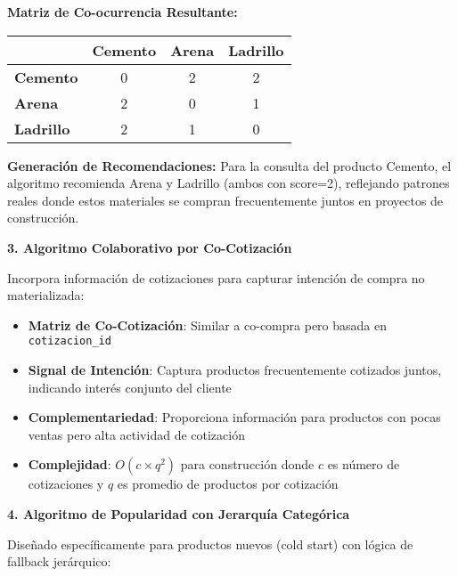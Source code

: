 \documentclass[twocolumn]{article}
\begin{document}
\textbf{Matriz de Co-ocurrencia Resultante:}

\begin{table}[H]
\centering
\begin{tabular}{|l|c|c|c|}
\hline
& \textbf{Cemento} & \textbf{Arena} & \textbf{Ladrillo} \\
\hline
\textbf{Cemento} & 0 & 2 & 2 \\
\hline
\textbf{Arena} & 2 & 0 & 1 \\
\hline
\textbf{Ladrillo} & 2 & 1 & 0 \\
\hline
\end{tabular}
\end{table}

\textbf{Generación de Recomendaciones:}
Para la consulta del producto Cemento, el algoritmo recomienda Arena y Ladrillo (ambos con score=2), reflejando patrones reales donde estos materiales se compran frecuentemente juntos en proyectos de construcción.

\vspace{0.3cm}

\textbf{3. Algoritmo Colaborativo por Co-Cotización}

Incorpora información de cotizaciones para capturar intención de compra no materializada:

\begin{itemize}
    \item \textbf{Matriz de Co-Cotización}: Similar a co-compra pero basada en \texttt{cotizacion\_id}
    \item \textbf{Signal de Intención}: Captura productos frecuentemente cotizados juntos, indicando interés conjunto del cliente
    \item \textbf{Complementariedad}: Proporciona información para productos con pocas ventas pero alta actividad de cotización
    \item \textbf{Complejidad}: \(O(c \times q^2)\) para construcción donde \(c\) es número de cotizaciones y \(q\) es promedio de productos por cotización
\end{itemize}

\textbf{4. Algoritmo de Popularidad con Jerarquía Categórica}

Diseñado específicamente para productos nuevos (cold start) con lógica de fallback jerárquico:
\end{document}
